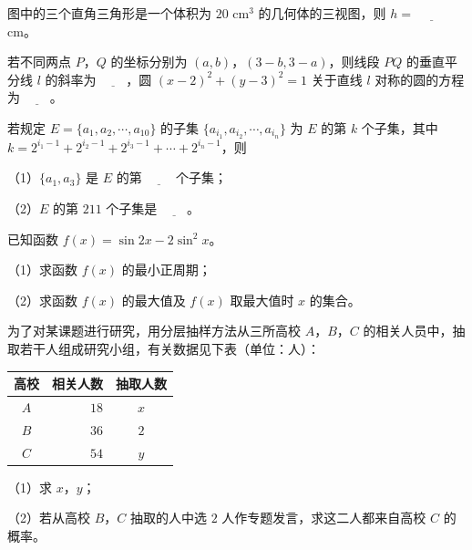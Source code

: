 \endgroup
\begingroup
\renewenvironment{question}{\Needspace{0.5\textheight}}{}
\begin{question}
图中的三个直角三角形是一个体积为 $20$ cm$^3$ 的几何体的三视图，则 $h=$ $\underline{\qquad}$ cm。
\nopagebreak[4]
\begin{center}\end{center}
\nopagebreak[4]
\end{question}
\endgroup
\begin{question}
若不同两点 $P$，$Q$ 的坐标分别为 $(a,b)$，$(3-b,3-a)$，则线段 $PQ$ 的垂直平分线 $l$ 的斜率为 $\underline{\qquad}$，圆 $(x-2)^2+(y-3)^2=1$ 关于直线 $l$ 对称的圆的方程为 $\underline{\qquad}$。

\end{question}
\begin{question}
若规定 $E=\{a_1,a_2,\cdots,a_{10}\}$ 的子集 $\{a_{i_1},a_{i_2},\cdots,a_{i_n}\}$ 为 $E$ 的第 $k$ 个子集，其中 $k=2^{i_1-1}+2^{i_2-1}+2^{i_3-1}+\cdots+2^{i_n-1}$，则

（1）$\{a_1,a_3\}$ 是 $E$ 的第 $\underline{\qquad}$ 个子集；

（2）$E$ 的第 $211$ 个子集是 $\underline{\qquad}$。

\end{question}
\begin{question}
已知函数 $f(x)=\sin2x-2\sin^2x$。

（1）求函数 $f(x)$ 的最小正周期；

（2）求函数 $f(x)$ 的最大值及 $f(x)$ 取最大值时 $x$ 的集合。

\end{question}
\begin{question}
为了对某课题进行研究，用分层抽样方法从三所高校 $A$，$B$，$C$ 的相关人员中，抽取若干人组成研究小组，有关数据见下表（单位：人）：

\begin{center}
\begin{tabular}{crc}
\toprule
高校 & 相关人数 & 抽取人数 \\
\midrule
$A$ & $18$ & $x$ \\
$B$ & $36$ & $2$ \\
$C$ & $54$ & $y$ \\
\bottomrule
\end{tabular}
\end{center}

（1）求 $x$，$y$；

（2）若从高校 $B$，$C$ 抽取的人中选 $2$ 人作专题发言，求这二人都来自高校 $C$ 的概率。

\Needspace{0.4\textheight}
\end{question}

